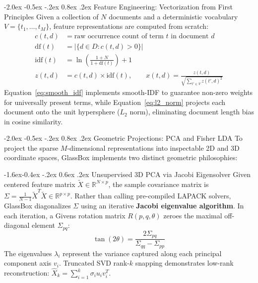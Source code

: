\documentclass[12pt,a4paper]{report}
\makeatletter
\renewcommand\section{\@startsection {section}{1}{\z@}%
                                   {-2.0ex \@plus -0.5ex \@minus -.2ex}%
                                   {0.8ex \@plus.2ex}%
                                   {\normalfont\fontsize{14}{17}\bfseries\color{headerblue}}}
\renewcommand\subsection{\@startsection{subsection}{2}{\z@}%
                                       {-1.6ex\@plus -0.4ex \@minus -.2ex}%
                                       {0.6ex \@plus .2ex}%
                                       {\normalfont\fontsize{12}{15}\bfseries\color{darkslate}}}
\makeatother
\begin{document}
\section{Feature Engineering: Vectorization from First Principles}
Given a collection of $N$ documents and a deterministic vocabulary $V = \{t_1, \dots, t_M\}$, feature representations are computed from scratch:
\begin{align}
    c(t, d) &= \text{raw occurrence count of term } t \text{ in document } d \\
    \text{df}(t) &= |\{d \in D : c(t, d) > 0\}| \\
    \text{idf}(t) &= \ln \left( \frac{1 + N}{1 + \text{df}(t)} \right) + 1 \label{eq:smooth_idf} \\
    z(t, d) &= c(t, d) \times \text{idf}(t), \qquad x(t, d) = \frac{z(t, d)}{\sqrt{\sum_{t' \in V} z(t', d)^2}} \label{eq:l2_norm}
\end{align}
Equation~\eqref{eq:smooth_idf} implements smooth-IDF to guarantee non-zero weights for universally present terms, while Equation~\eqref{eq:l2_norm} projects each document onto the unit hypersphere ($L_2$ norm), eliminating document length bias in cosine similarity.

\section{Geometric Projections: PCA and Fisher LDA}
To project the sparse $M$-dimensional representations into inspectable 2D and 3D coordinate spaces, GlassBox implements two distinct geometric philosophies:

\subsection{Unsupervised 3D PCA via Jacobi Eigensolver}
Given centered feature matrix $\tilde{X} \in \mathbb{R}^{N \times p}$, the sample covariance matrix is $\Sigma = \frac{1}{N - 1} \tilde{X}^T \tilde{X} \in \mathbb{R}^{p \times p}$. Rather than calling pre-compiled LAPACK solvers, GlassBox diagonalizes $\Sigma$ using an iterative \textbf{Jacobi eigenvalue algorithm}. In each iteration, a Givens rotation matrix $R(p, q, \theta)$ zeroes the maximal off-diagonal element $\Sigma_{pq}$:
\begin{equation}
    \tan(2\theta) = \frac{2\Sigma_{pq}}{\Sigma_{qq} - \Sigma_{pp}}
\end{equation}
The eigenvalues $\lambda_i$ represent the variance captured along each principal component axis $v_i$. Truncated SVD rank-$k$ snapping demonstrates low-rank reconstruction: $\hat{X}_k = \sum_{i=1}^k \sigma_i u_i v_i^T$.
\end{document}
